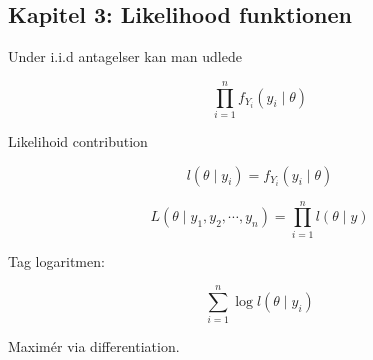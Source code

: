 \subsection{Kapitel 3: Likelihood funktionen}

Under i.i.d antagelser kan man udlede

\begin{equation}
    \prod_{i=1}^{n} f_{Y_i} (y_i \mid \theta)
\end{equation}

Likelihoid contribution

\begin{equation}
    l(\theta \mid y_i) = f_{Y_i} (y_i \mid \theta )
\end{equation}

\begin{equation}
    L(\theta \mid y_1, y_2 , \cdots , y_n) = \prod_{i=1}^n l (\theta  \mid y)
\end{equation}

Tag logaritmen:

\begin{equation}
    \sum_{i=1}^n \log l (\theta \mid y_i)
\end{equation}

Maximér via differentiation.



